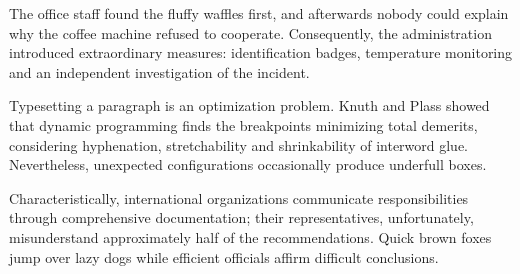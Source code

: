 \documentclass{article}
\begin{document}
The office staff found the fluffy waffles first, and afterwards nobody could
explain why the coffee machine refused to cooperate. Consequently, the
administration introduced extraordinary measures: identification badges,
temperature monitoring and an independent investigation of the incident.

Typesetting a paragraph is an optimization problem. Knuth and Plass showed
that dynamic programming finds the breakpoints minimizing total demerits,
considering hyphenation, stretchability and shrinkability of interword glue.
Nevertheless, unexpected configurations occasionally produce underfull boxes.

Characteristically, international organizations communicate responsibilities
through comprehensive documentation; their representatives, unfortunately,
misunderstand approximately half of the recommendations. Quick brown foxes
jump over lazy dogs while efficient officials affirm difficult conclusions.
\end{document}
